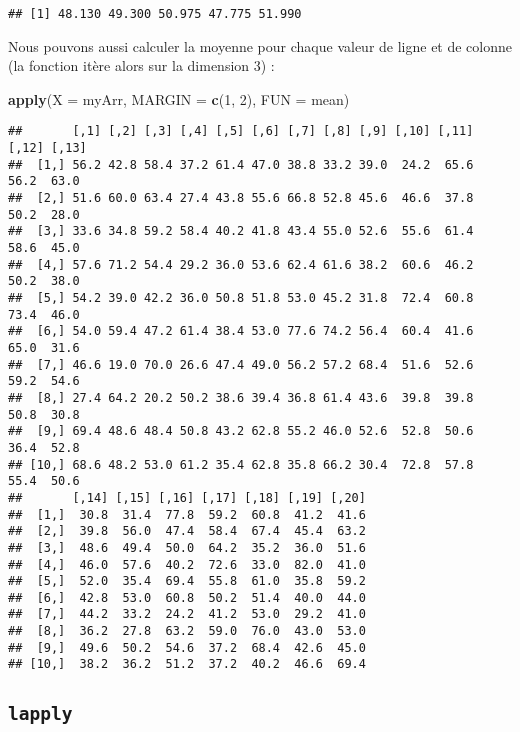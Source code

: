 \documentclass[]{book}
\newenvironment{Shaded}{\begin{snugshade}}{\end{snugshade}}
\newcommand{\KeywordTok}[1]{\textcolor[rgb]{0.13,0.29,0.53}{\textbf{#1}}}
\newcommand{\DataTypeTok}[1]{\textcolor[rgb]{0.13,0.29,0.53}{#1}}
\newcommand{\DecValTok}[1]{\textcolor[rgb]{0.00,0.00,0.81}{#1}}
\newcommand{\NormalTok}[1]{#1}
\theoremstyle{definition}
\theoremstyle{definition}
\theoremstyle{definition}
\theoremstyle{remark}
\begin{document}
\begin{verbatim}
## [1] 48.130 49.300 50.975 47.775 51.990
\end{verbatim}

Nous pouvons aussi calculer la moyenne pour chaque valeur de ligne et de
colonne (la fonction itère alors sur la dimension 3) :

\begin{Shaded}
\begin{Highlighting}[]
\KeywordTok{apply}\NormalTok{(}\DataTypeTok{X =}\NormalTok{ myArr, }\DataTypeTok{MARGIN =} \KeywordTok{c}\NormalTok{(}\DecValTok{1}\NormalTok{, }\DecValTok{2}\NormalTok{), }\DataTypeTok{FUN =}\NormalTok{ mean)}
\end{Highlighting}
\end{Shaded}

\begin{verbatim}
##       [,1] [,2] [,3] [,4] [,5] [,6] [,7] [,8] [,9] [,10] [,11] [,12] [,13]
##  [1,] 56.2 42.8 58.4 37.2 61.4 47.0 38.8 33.2 39.0  24.2  65.6  56.2  63.0
##  [2,] 51.6 60.0 63.4 27.4 43.8 55.6 66.8 52.8 45.6  46.6  37.8  50.2  28.0
##  [3,] 33.6 34.8 59.2 58.4 40.2 41.8 43.4 55.0 52.6  55.6  61.4  58.6  45.0
##  [4,] 57.6 71.2 54.4 29.2 36.0 53.6 62.4 61.6 38.2  60.6  46.2  50.2  38.0
##  [5,] 54.2 39.0 42.2 36.0 50.8 51.8 53.0 45.2 31.8  72.4  60.8  73.4  46.0
##  [6,] 54.0 59.4 47.2 61.4 38.4 53.0 77.6 74.2 56.4  60.4  41.6  65.0  31.6
##  [7,] 46.6 19.0 70.0 26.6 47.4 49.0 56.2 57.2 68.4  51.6  52.6  59.2  54.6
##  [8,] 27.4 64.2 20.2 50.2 38.6 39.4 36.8 61.4 43.6  39.8  39.8  50.8  30.8
##  [9,] 69.4 48.6 48.4 50.8 43.2 62.8 55.2 46.0 52.6  52.8  50.6  36.4  52.8
## [10,] 68.6 48.2 53.0 61.2 35.4 62.8 35.8 66.2 30.4  72.8  57.8  55.4  50.6
##       [,14] [,15] [,16] [,17] [,18] [,19] [,20]
##  [1,]  30.8  31.4  77.8  59.2  60.8  41.2  41.6
##  [2,]  39.8  56.0  47.4  58.4  67.4  45.4  63.2
##  [3,]  48.6  49.4  50.0  64.2  35.2  36.0  51.6
##  [4,]  46.0  57.6  40.2  72.6  33.0  82.0  41.0
##  [5,]  52.0  35.4  69.4  55.8  61.0  35.8  59.2
##  [6,]  42.8  53.0  60.8  50.2  51.4  40.0  44.0
##  [7,]  44.2  33.2  24.2  41.2  53.0  29.2  41.0
##  [8,]  36.2  27.8  63.2  59.0  76.0  43.0  53.0
##  [9,]  49.6  50.2  54.6  37.2  68.4  42.6  45.0
## [10,]  38.2  36.2  51.2  37.2  40.2  46.6  69.4
\end{verbatim}

\subsection{\texorpdfstring{\texttt{lapply}}{lapply}}\label{l17sapply}
\end{document}
